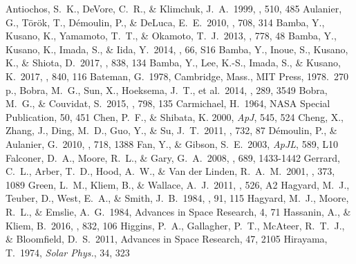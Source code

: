 \documentclass[10pt,preprint2]{aastex}
\begin{document}
\begin{thebibliography}{}

 Antiochos, S.~K., DeVore, C.~R., \& Klimchuk, J.~A.\ 1999, \apj, 510, 485 
 Aulanier, G., T{\"o}r{\"o}k, T., D{\'e}moulin, P., \& DeLuca, E.~E.\ 2010, \apj, 708, 314 
 Bamba, Y., Kusano, K., Yamamoto, T.~T., \& Okamoto, T.~J.\ 2013, \apj, 778, 48
 Bamba, Y., Kusano, K., Imada, S., \& Iida, Y.\ 2014, \pasj, 66, S16
 Bamba, Y., Inoue, S., Kusano, K., \& Shiota, D.\ 2017, \apj, 838, 134 
 Bamba, Y., Lee, K.-S., Imada, S., \& Kusano, K.\ 2017, \apj, 840, 116 
 Bateman, G.\ 1978, Cambridge, Mass., MIT Press, 1978.~270 p.,  
 Bobra, M.~G., Sun, X., Hoeksema, J.~T., et al.\ 2014, \solphys, 289, 3549
 Bobra, M.~G., \& Couvidat, S.\ 2015, \apj, 798, 135 
 Carmichael, H.\ 1964, NASA Special Publication, 50, 451
 Chen, P.~F., \& Shibata, K. 2000, {\it ApJ}, 545, 524
 Cheng, X., Zhang, J., Ding, M.~D., Guo, Y., \& Su, J.~T.\ 2011, \apj, 732, 87 
 D{\'e}moulin, P., \& Aulanier, G.\ 2010, \apj, 718, 1388 
 Fan, Y., \& Gibson, S.~E.\ 2003, {\it ApJL}, 589, L10
 Falconer, D.~A., Moore, R.~L., \& Gary, G.~A.\ 2008, \apj, 689, 1433-1442 
 Gerrard, C.~L., Arber, T.~D., Hood, A.~W., \& Van der Linden, R.~A.~M.\ 2001, \aap, 373, 1089 
 Green, L.~M., Kliem, B., \& Wallace, A.~J.\ 2011, \aap, 526, A2 
 Hagyard, M.~J., Teuber, D., West, E.~A., \& Smith, J.~B.\ 1984, \solphys, 91, 115
 Hagyard, M.~J., Moore, R.~L., \& Emslie, A.~G.\ 1984, Advances in Space Research, 4, 71 
 Hassanin, A., \& Kliem, B.\ 2016, \apj, 832, 106 
 Higgins, P.~A., Gallagher, P.~T., McAteer, R.~T.~J., \& Bloomfield, D.~S.\ 2011, Advances in Space Research, 47, 2105 
 Hirayama, T.\ 1974, {\it Solar Phys.}, 34, 323

\end{thebibliography}
\end{document}
